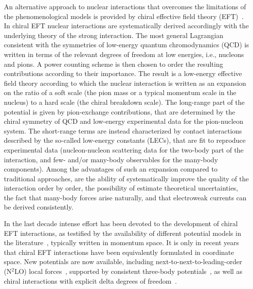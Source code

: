 \documentclass[aps,prc,twocolumn,superscriptaddress,floatfix]{revtex4-1}
\begin{document}
An alternative approach to nuclear interactions that overcomes the limitations
of the phenomenological models is provided by chiral effective field theory 
(EFT)~\cite{Epelbaum:2009,Machleidt:2011}.
In chiral EFT nuclear interactions are systematically derived accordingly with 
the underlying theory of the strong interaction. The most general 
Lagrangian consistent with the symmetries of low-energy quantum chromodynamics
(QCD) is written in terms 
of the relevant degrees of freedom at low energies, i.e., nucleons and pions.
A power counting scheme is then chosen to order the resulting contributions according 
to their importance. The result is a low-energy effective field theory according
to which the nuclear interaction is written as an expansion on the ratio of a 
soft scale (the pion mass or a typical momentum scale in the nucleus) to a
hard scale (the chiral breakdown scale). The long-range part of the potential
is given by pion-exchange contributions, that are determined by the chiral symmetry
of QCD and low-energy experimental data for the pion-nucleon system.
The short-range terms are instead characterized by contact
interactions described by the so-called low-energy constants (LECs), 
that are fit to reproduce experimental data (nucleon-nucleon scattering data for 
the two-body part of the interaction, and few- and/or many-body observables for 
the many-body components). 
Among the advantages of such an 
expansion compared to traditional approaches, are the ability of 
systematically improve the quality of the interaction order by order, 
the possibility of estimate theoretical uncertainties, the fact that
many-body forces arise naturally, and that electroweak currents can 
be derived consistently.

In the last decade intense effort has been devoted to the 
development of chiral EFT interactions, as testified by the 
availability of different potential models in the 
literature~\cite{Epelbaum:2009,Machleidt:2011,Ekstrom:2013,Entem:2015,
Epelbaum:2015,Ekstrom:2015,Ekstrom:2017}, typically written in momentum 
space. It is only in recent
years that chiral EFT interactions have been equivalently formulated 
in coordinate space. New potentials are now available, including 
next-to-next-to-leading-order (N$^2$LO) local 
forces~\cite{Gezerlis:2013,Gezerlis:2014}, supported by consistent
three-body potentials~\cite{Tews:2016,Lynn:2016}, as
well as chiral interactions with explicit delta degrees of
freedom~\cite{Piarulli:2015,Piarulli:2016,Piarulli:2017,Ekstrom:2017}.
\end{document}
